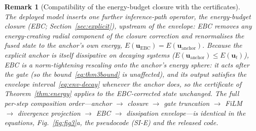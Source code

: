 \documentclass[11pt,a4paper]{article}
\newtheorem{remark}{Remark}
\newcommand{\bu}{\bm{u}}
\newcommand{\Ex}{E}
\begin{document}
\begin{remark}[Compatibility of the energy-budget closure with the certificates]
The deployed model inserts one further inference-path operator, the energy-budget closure (EBC; Section~\ref{sec:explicit}), \emph{upstream} of the envelope: EBC removes any energy-creating radial component of the closure correction and renormalises the fused state to the anchor's own energy, $\Ex(\bu_{\mathrm{EBC}})=\Ex(\bu_{\mathrm{anchor}})$. Because the explicit anchor is itself dissipative on decaying systems ($\Ex(\bu_{\mathrm{anchor}})\le\Ex(\bu_t)$), EBC is a norm-tightening rescaling onto the anchor's energy sphere: it acts after the gate (so the bound~\eqref{eq:thm3bound} is unaffected), and its output satisfies the envelope interval~\eqref{eq:env-decay} whenever the anchor does, so the certificate of Theorem~\ref{thm:energy} applies to the EBC-corrected state unchanged. The full per-step composition order---anchor $\to$ closure $\to$ gate truncation $\to$ FiLM $\to$ divergence projection $\to$ EBC $\to$ dissipation envelope---is identical in the equations, Fig.~\ref{fig:fig3}a, the pseudocode (SI-E) and the released code.
\end{remark}
\end{document}
